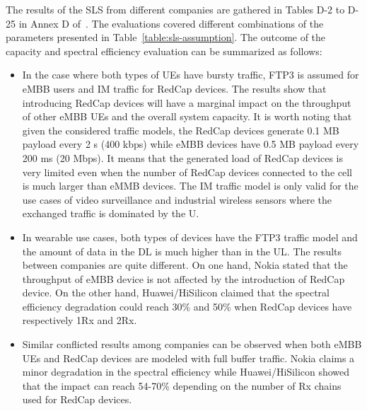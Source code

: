\documentclass[]{IEEEtran}
\begin{document}
The results of the SLS from different companies are gathered in Tables D-2 to D-25 in Annex D of~\cite{3gpp_study_2021_38.875}. 
The evaluations covered different combinations of the parameters presented in Table~\ref{table:sls-assumption}. 
The outcome of the capacity and spectral efficiency evaluation can be summarized as follows:

\begin{itemize}
    \item In the case where both types of UEs have bursty traffic, FTP3 is assumed for eMBB users and IM traffic for RedCap devices.
    The results show that introducing RedCap devices will have a marginal impact on the throughput of other eMBB UEs and the overall system capacity.
    It is worth noting that given the considered traffic models, the RedCap devices generate 0.1 MB payload every 2 s (400 kbps) while eMBB devices have 0.5 MB payload every 200 ms (20 Mbps). 
    It means that the generated load of RedCap devices is very limited even when the number of RedCap devices connected to the cell is much larger than eMMB devices. 
    The IM traffic model is only valid for the use cases of video surveillance and industrial wireless sensors where the exchanged traffic is dominated by the U.
    \item In wearable use cases, both types of devices have the FTP3 traffic model and the amount of data in the DL is much higher than in the UL.
    The results between companies are quite different.
    On one hand, Nokia stated that the throughput of eMBB device is not affected by the introduction of RedCap device. On the other hand, Huawei/HiSilicon claimed that the spectral efficiency degradation could reach 30\% and 50\% when RedCap devices have respectively 1Rx and 2Rx. 
    \item Similar conflicted results among companies can be observed when both eMBB UEs and RedCap devices are modeled with full buffer traffic. Nokia claims a minor degradation in the spectral efficiency while Huawei/HiSilicon showed that the impact can reach 54-70\% depending on the number of Rx chains used for RedCap devices.
\end{itemize}





\end{document}
